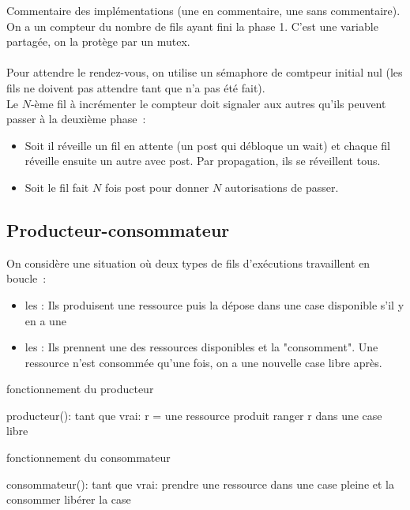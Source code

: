\begin{adjustwidth}{-3cm}{-3cm}
Commentaire des implémentations (une en commentaire, une sans commentaire).\\
On a un compteur du nombre de fils ayant fini la phase 1. C'est une variable partagée, on la protège par un mutex.\\\\
Pour attendre le rendez-vous, on utilise un sémaphore de comtpeur initial nul (les fils ne doivent pas attendre tant que  n'a pas été fait). \\
Le $N$-ème fil à incrémenter le compteur doit signaler aux autres qu'ils peuvent passer à la deuxième phase~:
\begin{itemize}
    \item Soit il réveille un fil en attente (un post qui débloque un wait) et chaque fil réveille ensuite un autre avec post. Par propagation, ils se réveillent tous.
    \item Soit le fil fait $N$ fois post pour donner $N$ autorisations de passer.
\end{itemize}

\subsection{Producteur-consommateur}
On considère une situation où deux types de fils d'exécutions travaillent en boucle~:
\begin{itemize}
    \item les  : Ils produisent une ressource puis la dépose dans une case disponible s'il y en a une
    \item les  : Ils prennent une des ressources disponibles et la "consomment". Une ressource n'est consommée qu'une fois, on a une nouvelle case libre après.
\end{itemize}

\begin{implementation}{fonctionnement du producteur}
    \begin{lstLNat}
    producteur():
        tant que vrai:
            r = une ressource produit
            ranger r dans une case libre
    \end{lstLNat}
\end{implementation}

\begin{implementation}{fonctionnement du consommateur}
    \begin{lstLNat}
    consommateur():
        tant que vrai:
            prendre une ressource dans une case pleine et la consommer
            libérer la case
        

\end{lstLNat}
\end{implementation}
\end{adjustwidth}
